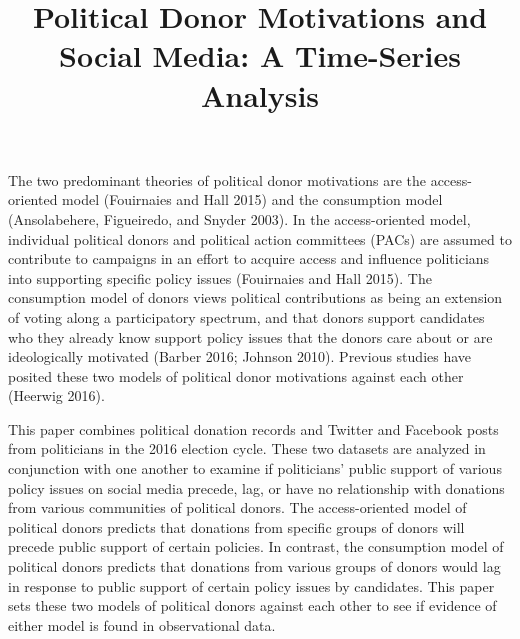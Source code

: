 \documentclass[12pt,]{article}
\title{Political Donor Motivations and Social Media: A Time-Series Analysis  }
\author{\Large \vspace{0.05in} \newline\normalsize\emph{}  }
\date{}
\newcommand*{\authorfont}{\fontfamily{phv}\selectfont}
\begin{document}
	
%

{%
\setlength{\parindent}{0pt}
\thispagestyle{plain}
{\fontsize{18}{20}\selectfont\raggedright 
\maketitle  %

}

{
   \vskip 13.5pt\relax \normalsize\fontsize{11}{12} 
\textbf{\authorfont } \hskip 15pt \emph{\small }   

}

}






\vskip -8.5pt



\noindent \doublespacing 

The two predominant theories of political donor motivations are the
access-oriented model (Fouirnaies and Hall 2015) and the consumption
model (Ansolabehere, Figueiredo, and Snyder 2003). In the
access-oriented model, individual political donors and political action
committees (PACs) are assumed to contribute to campaigns in an effort to
acquire access and influence politicians into supporting specific policy
issues (Fouirnaies and Hall 2015). The consumption model of donors views
political contributions as being an extension of voting along a
participatory spectrum, and that donors support candidates who they
already know support policy issues that the donors care about or are
ideologically motivated (Barber 2016; Johnson 2010). Previous studies
have posited these two models of political donor motivations against
each other (Heerwig 2016).

This paper combines political donation records and Twitter and Facebook
posts from politicians in the 2016 election cycle. These two datasets
are analyzed in conjunction with one another to examine if politicians'
public support of various policy issues on social media precede, lag, or
have no relationship with donations from various communities of
political donors. The access-oriented model of political donors predicts
that donations from specific groups of donors will precede public
support of certain policies. In contrast, the consumption model of
political donors predicts that donations from various groups of donors
would lag in response to public support of certain policy issues by
candidates. This paper sets these two models of political donors against
each other to see if evidence of either model is found in observational
data.
\end{document}
